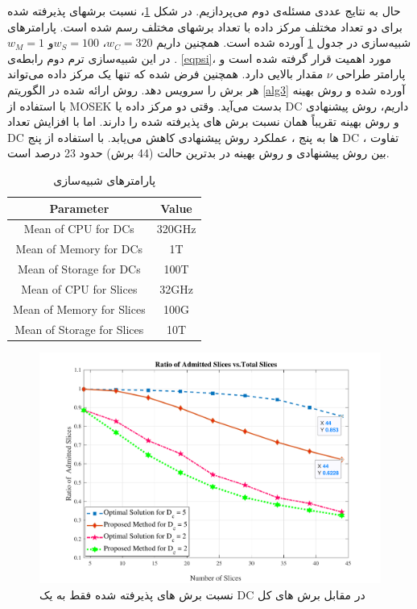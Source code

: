 حال به نتایج عددی مسئله‌ی دوم می‌پردازیم.
در شکل \ref{fig:f1}، نسبت برشهای پذیرفته شده برای دو تعداد مختلف مرکز داده با تعداد برشهای مختلف رسم شده است. پارامترهای شبیه‌سازی در جدول \ref{table:1} آورده شده است. همچنین داریم 
 $w_C = 320$،
 $w_S = 100$و 
 $w_M =1$.
 در این شبیه‌سازی ترم دوم رابطه‌ی \eqref{eqpsi}، مورد اهمیت قرار گرفته شده است و پارامتر طراحی $\nu$ مقدار بالایی دارد.
 همچنین فرض شده که تنها یک مرکز داده می‌تواند هر برش را سرویس دهد. روش ارائه شده در الگوریتم  \ref{alg3} آورده شده و روش بهینه با استفاده از MOSEK بدست می‌آید.
 وقتی دو مرکز داده یا DC داریم، روش پیشنهادی و روش بهینه تقریباً همان نسبت برش های پذیرفته شده را دارند. اما با افزایش تعداد DC ها به پنج ، عملکرد روش پیشنهادی کاهش می‌یابد.
 با استفاده از پنج DC ، تفاوت بین روش پیشنهادی و روش بهینه در بدترین حالت (44 برش) حدود 23 درصد است.

\begin{small}
	\begin{table}
		\caption {پارامترهای شبیه‌سازی} \label{table:1}
		\begin{latin}	
		\begin{center}
			\begin{tabular}{||c c ||}
				\hline
				Parameter & Value \\ [0.5ex]
				\hline\hline
				Mean of CPU for DCs & 320GHz\\
				\hline
				Mean of Memory for DCs & 1T\\
				\hline
				Mean of Storage for DCs & 100T \\
				\hline
				Mean of CPU for Slices & 32GHz\\
				\hline
				Mean of Memory for Slices & 100G\\
				\hline
				Mean of Storage for Slices & 10T \\ [1ex]
				\hline
			\end{tabular}
		\end{center}
	\end{latin}
	\end{table}
\end{small}
\begin{figure}%
	\centering
	\includegraphics[scale = 0.5]{./fig/f112}
	\caption{نسبت برش های پذیرفته شده فقط به یک 	DC در مقابل برش های کل}
	\label{fig:f1}
\end{figure}
